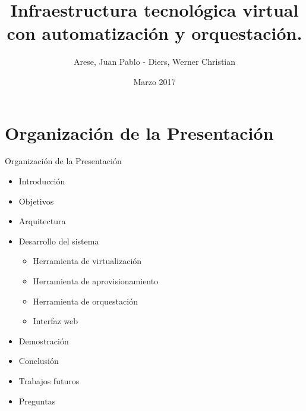 \usepackage[english]{babel}
\usepackage[utf8x]{inputenc}

\title[Your Short Title]{Infraestructura tecnológica virtual con automatización y orquestación.}
\author{Arese, Juan Pablo - Diers, Werner Christian}
\date{Marzo 2017}




\begin{frame}
  \titlepage
\end{frame}


\section{Organización de la Presentación}

\begin{frame}{Organización de la Presentación}
    \vspace{-1cm}
    \begin{itemize}
        \item Introducción
        \item Objetivos
        \item Arquitectura
        \item Desarrollo del sistema
        \begin{itemize}
            \item Herramienta de virtualización
            \item Herramienta de aprovisionamiento
            \item Herramienta de orquestación
            \item Interfaz web
        \end{itemize}
        \item Demostración
        \item Conclusión
        \item Trabajos futuros
        \item Preguntas
    \end{itemize}

\end{frame}


